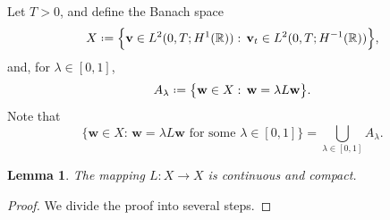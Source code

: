 \documentclass[11pt,a4paper,reqno]{amsart}
\numberwithin{equation}{section}
\newtheorem{lemma}{Lemma}[section]
\theoremstyle{definition}
\theoremstyle{remark}
\newcommand{\bv}{\mathbf{v}}
\newcommand{\bw}{\mathbf{w}}
\newcommand*{\defeq}{\mathrel{\vcenter{\baselineskip0.5ex \lineskiplimit0pt
                     \hbox{\scriptsize.}\hbox{\scriptsize.}}}%
                     =}
\begin{document}
{Let $T>0$, and define the Banach space 
\begin{equation*}
    X \defeq \Big\{ \bv \in L^2(0,T;H^1(\mathbb{R})) : \, \bv_t \in L^2(0,T;H^{-1}(\mathbb{R})) \Big\}, 
\end{equation*}
and, for $\lambda \in [0,1]$, 
\begin{equation*}
    A_\lambda \defeq \big\{ \bw \in X : \, \bw = \lambda L\bw \big\}. 
\end{equation*}
Note that 
\begin{equation}\label{eq:identification Alambda}
        \Big\{ \bw \in X : \, \bw = \lambda L\bw \text{ for some } \lambda \in [0,1] \Big\} = \bigcup_{\lambda \in [0,1]} A_\lambda. 
    \end{equation}













\begin{lemma}\label{lem:fixed pt i}
    The mapping $L : X \to X$ is continuous and compact.
\end{lemma}

\begin{proof}
We divide the proof into several steps. 

\smallskip 



\end{proof}}
\end{document}
